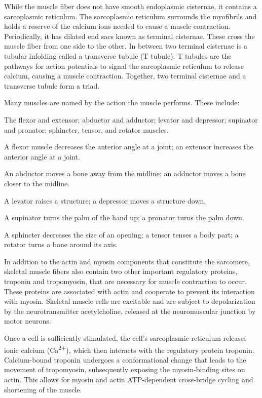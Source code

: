 \documentclass[]{book}
\begin{document}
While the muscle fiber does not have smooth endoplasmic cisternae, it contains a sarcoplasmic reticulum. The sarcoplasmic reticulum surrounds the myofibrils and holds a reserve of the calcium ions needed to cause a muscle contraction. Periodically, it has dilated end sacs known as terminal cisternae. These cross the muscle fiber from one side to the other. In between two terminal cisternae is a tubular infolding called a transverse tubule (T tubule). T tubules are the pathways for action potentials to signal the sarcoplasmic reticulum to release calcium, causing a muscle contraction. Together, two terminal cisternae and a transverse tubule form a triad.

Many muscles are named by the action the muscle performs. These include:

The flexor and extensor; abductor and adductor; levator and depressor; supinator and pronator; sphincter, tensor, and rotator muscles.

A flexor muscle decreases the anterior angle at a joint; an extensor increases the anterior angle at a joint.

An abductor moves a bone away from the midline; an adductor moves a bone closer to the midline.

A levator raises a structure; a depressor moves a structure down.

A supinator turns the palm of the hand up; a pronator turns the palm down.

A sphincter decreases the size of an opening; a tensor tenses a body part; a rotator turns a bone around its axis.

In addition to the actin and myosin components that constitute the sarcomere, skeletal muscle fibers also contain two other important regulatory proteins, troponin and tropomyosin, that are necessary for muscle contraction to occur. These proteins are associated with actin and cooperate to prevent its interaction with myosin. Skeletal muscle cells are excitable and are subject to depolarization by the neurotransmitter acetylcholine, released at the neuromuscular junction by motor neurons.

Once a cell is sufficiently stimulated, the cell's sarcoplasmic reticulum releases ionic calcium (Ca\textsuperscript{2+}), which then interacts with the regulatory protein troponin. Calcium-bound troponin undergoes a conformational change that leads to the movement of tropomyosin, subsequently exposing the myosin-binding sites on actin. This allows for myosin and actin ATP-dependent cross-bridge cycling and shortening of the muscle.
\end{document}
